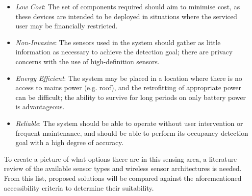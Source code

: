 \documentclass[../thesis/thesis.tex]{subfiles}
\begin{document}
\begin{itemize}
 \item \emph{Low Cost}: The set of components required should aim to minimise cost, as these devices are intended to be deployed in situations where the serviced user may be financially restricted.
 
 \item \emph{Non-Invasive}: The sensors used in the system should gather as little information as necessary to achieve the detection goal; there are privacy concerns with the use of high-definition sensors.
 
 \item \emph{Energy Efficient}: The system may be placed in a location where there is no access to mains power (e.g. roof), and the retrofitting of appropriate power can be difficult; the ability to survive for long periods on only battery power is advantageous.
 
 \item \emph{Reliable}: The system should be able to operate without user intervention or frequent maintenance, and should be able to perform its occupancy detection goal with a high degree of accuracy.
\end{itemize}

To create a picture of what options there are in this sensing area, a literature review of the available sensor types and wireless sensor architectures is needed. From this list, proposed solutions will be compared against the aforementioned accessibility criteria to determine their suitability.
 
\end{document}
